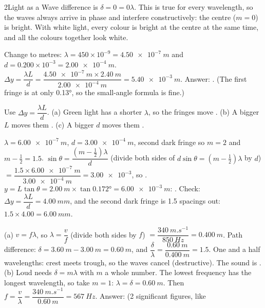 \begin{chapteranswers}{2}{Light as a Wave}
        difference is $\delta = 0 = 0\lambda$. This is true for every wavelength, so the
        waves always arrive in phase and interfere constructively: the centre ($m = 0$)
        is bright. With white light, every colour is bright at the centre at the same
        time, and all the colours together look white.
  \item Change to metres: $\lambda = 450 \times 10^{-9} = \qty{4.50e-7}{m}$ and
        $d = 0.200 \times 10^{-3} = \qty{2.00e-4}{m}$.
        $\Delta y = \dfrac{\lambda L}{d} = \dfrac{\qty{4.50e-7}{m} \times \qty{2.40}{m}}
        {\qty{2.00e-4}{m}} = \qty{5.40e-3}{m}$. Answer:
        . (The first fringe is at only \ang{0.13}, so
        the small-angle formula is fine.)
  \item Use $\Delta y = \dfrac{\lambda L}{d}$.
        (a) Green light has a shorter $\lambda$, so the fringes move .
        (b) A bigger $L$ moves them .
        (c) A bigger $d$ moves them .
  \item $\lambda = \qty{6.00e-7}{m}$, $d = \qty{3.00e-4}{m}$, second dark fringe so $m = 2$
        and $m - \tfrac{1}{2} = 1.5$.
        $\sin\theta = \dfrac{\left(m - \frac{1}{2}\right)\lambda}{d}$ (divide both sides of
        $d\sin\theta = \left(m - \frac{1}{2}\right)\lambda$ by $d$)
        $= \dfrac{1.5 \times \qty{6.00e-7}{m}}{\qty{3.00e-4}{m}} = \num{3.00e-3}$, so
        .
        $y = L\tan\theta = \qty{2.00}{m} \times \tan\ang{0.172} = \qty{6.00e-3}{m}$:
        . Check: $\Delta y = \dfrac{\lambda L}{d} = \qty{4.00}{mm}$,
        and the second dark fringe is 1.5 spacings out: $1.5 \times 4.00 = \qty{6.00}{mm}$.
  \item (a) $v = f\lambda$, so $\lambda = \dfrac{v}{f}$ (divide both sides by $f$)
        $= \dfrac{\qty{340}{m.s^{-1}}}{\qty{850}{Hz}} = \qty{0.400}{m}$.
        Path difference: $\delta = \qty{3.60}{m} - \qty{3.00}{m} = \qty{0.60}{m}$, and
        $\dfrac{\delta}{\lambda} = \dfrac{\qty{0.60}{m}}{\qty{0.400}{m}} = 1.5$. One and a half
        wavelengths: crest meets trough, so the waves cancel (destructive). The sound is
        .
        (b) Loud needs $\delta = m\lambda$ with $m$ a whole number. The lowest frequency has
        the longest wavelength, so take $m = 1$: $\lambda = \delta = \qty{0.60}{m}$. Then
        $f = \dfrac{v}{\lambda} = \dfrac{\qty{340}{m.s^{-1}}}{\qty{0.60}{m}} = \qty{567}{Hz}$.
        Answer:  (2 significant figures, like

\end{chapteranswers}
